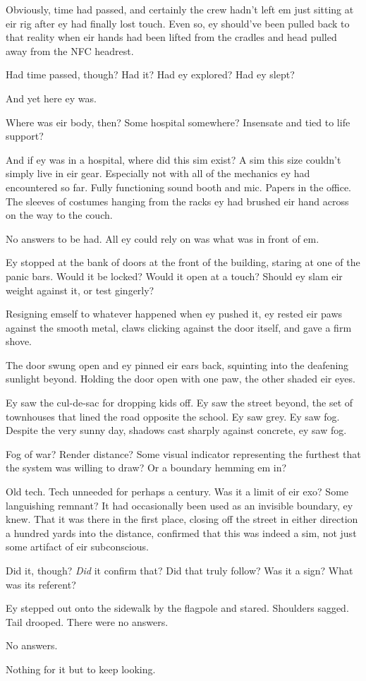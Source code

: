 Obviously, time had passed, and certainly the crew hadn't left em just sitting at eir rig after ey had finally lost touch. Even so, ey should've been pulled back to that reality when eir hands had been lifted from the cradles and head pulled away from the NFC headrest.

Had time passed, though? Had it? Had ey explored? Had ey slept?

And yet here ey was.

Where was eir body, then? Some hospital somewhere? Insensate and tied to life support?

And if ey was in a hospital, where did this sim exist? A sim this size couldn't simply live in eir gear. Especially not with all of the mechanics ey had encountered so far. Fully functioning sound booth and mic. Papers in the office. The sleeves of costumes hanging from the racks ey had brushed eir hand across on the way to the couch.

No answers to be had. All ey could rely on was what was in front of em.

Ey stopped at the bank of doors at the front of the building, staring at one of the panic bars. Would it be locked? Would it open at a touch? Should ey slam eir weight against it, or test gingerly?

Resigning emself to whatever happened when ey pushed it, ey rested eir paws against the smooth metal, claws clicking against the door itself, and gave a firm shove.

The door swung open and ey pinned eir ears back, squinting into the deafening sunlight beyond. Holding the door open with one paw, the other shaded eir eyes.

Ey saw the cul-de-sac for dropping kids off. Ey saw the street beyond, the set of townhouses that lined the road opposite the school. Ey saw grey. Ey saw fog. Despite the very sunny day, shadows cast sharply against concrete, ey saw fog.

Fog of war? Render distance? Some visual indicator representing the furthest that the system was willing to draw? Or a boundary hemming em in?

Old tech. Tech unneeded for perhaps a century. Was it a limit of eir exo? Some languishing remnant? It had occasionally been used as an invisible boundary, ey knew. That it was there in the first place, closing off the street in either direction a hundred yards into the distance, confirmed that this was indeed a sim, not just some artifact of eir subconscious.

Did it, though? \emph{Did} it confirm that? Did that truly follow? Was it a sign? What was its referent?

Ey stepped out onto the sidewalk by the flagpole and stared. Shoulders sagged. Tail drooped. There were no answers.

No answers.

Nothing for it but to keep looking.
